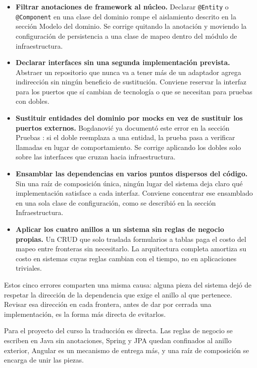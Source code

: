 \documentclass[10pt,a4paper]{article}
\begin{document}
\begin{itemize}
	\item \textbf{Filtrar anotaciones de framework al núcleo.} Declarar \texttt{@Entity} o \texttt{@Component} en una clase del dominio rompe el aislamiento descrito en la sección Modelo del dominio. Se corrige quitando la anotación y moviendo la configuración de persistencia a una clase de mapeo dentro del módulo de infraestructura.
	\item \textbf{Declarar interfaces sin una segunda implementación prevista.} Abstraer un repositorio que nunca va a tener más de un adaptador agrega indirección sin ningún beneficio de sustitución. Conviene reservar la interfaz para los puertos que sí cambian de tecnología o que se necesitan para pruebas con dobles.
	\item \textbf{Sustituir entidades del dominio por mocks en vez de sustituir los puertos externos.} Bogdanović ya documentó este error en la sección Pruebas \cite{optivem2023}: si el doble reemplaza a una entidad, la prueba pasa a verificar llamadas en lugar de comportamiento. Se corrige aplicando los dobles solo sobre las interfaces que cruzan hacia infraestructura.
	\item \textbf{Ensamblar las dependencias en varios puntos dispersos del código.} Sin una raíz de composición única, ningún lugar del sistema deja claro qué implementación satisface a cada interfaz. Conviene concentrar ese ensamblado en una sola clase de configuración, como se describió en la sección Infraestructura.
	\item \textbf{Aplicar los cuatro anillos a un sistema sin reglas de negocio propias.} Un CRUD que solo traslada formularios a tablas paga el costo del mapeo entre fronteras sin necesitarlo. La arquitectura completa amortiza su costo en sistemas cuyas reglas cambian con el tiempo, no en aplicaciones triviales.
\end{itemize}

Estos cinco errores comparten una misma causa: alguna pieza del sistema dejó de respetar la dirección de la dependencia que exige el anillo al que pertenece. Revisar esa dirección en cada frontera, antes de dar por cerrada una implementación, es la forma más directa de evitarlos.

Para el proyecto del curso la traducción es directa. Las reglas de negocio se escriben en Java sin anotaciones, Spring y JPA quedan confinados al anillo exterior, Angular es un mecanismo de entrega más, y una raíz de composición se encarga de unir las piezas.


\pagebreak

\section{\color{colorIPN}{Referencias Bibliográficas}}
\color{colorESCOM}{
	\printbibliography[heading=none]
}
\end{document}
